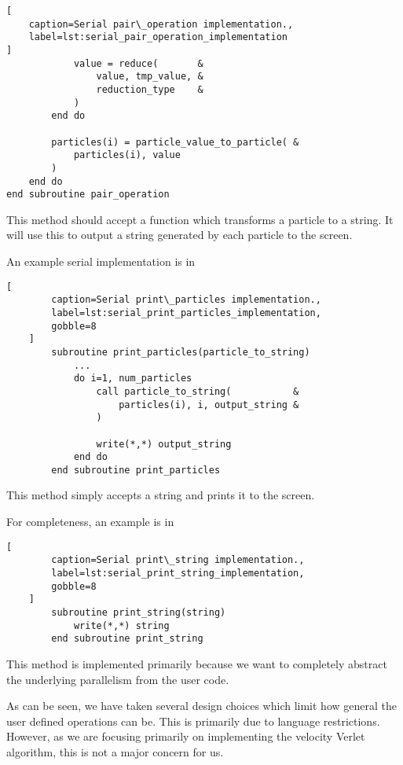 \begin{description}[style=nextline]
\begin{lstlisting}[
    caption=Serial pair\_operation implementation.,
    label=lst:serial_pair_operation_implementation
]
            value = reduce(       &
                value, tmp_value, &
                reduction_type    & 
            )
        end do

        particles(i) = particle_value_to_particle( &
            particles(i), value
        )
    end do
end subroutine pair_operation
\end{lstlisting}

\item[print\_particles]
    This method should accept a function which transforms a particle
    to a string. It will use this to output a string generated by
    each particle to the screen.

    An example serial implementation is in

    \begin{lstlisting}[
        caption=Serial print\_particles implementation.,
        label=lst:serial_print_particles_implementation,
        gobble=8
    ]
        subroutine print_particles(particle_to_string)
            ...
            do i=1, num_particles
                call particle_to_string(           &
                    particles(i), i, output_string &
                )

                write(*,*) output_string
            end do
        end subroutine print_particles
    \end{lstlisting}

\item[print\_string]
    This method simply accepts a string and prints it to the screen.

    For completeness, an example is in

    \begin{lstlisting}[
        caption=Serial print\_string implementation.,
        label=lst:serial_print_string_implementation,
        gobble=8
    ]
        subroutine print_string(string)
            write(*,*) string
        end subroutine print_string
    \end{lstlisting}

    This method is implemented primarily because we want to completely
    abstract the underlying parallelism from the user code.
\end  {description}

As can be seen, we have taken several design choices which limit how
general the user defined operations can be.
%
This is primarily due to language restrictions.
%
However, as we are focusing primarily on implementing the velocity
Verlet algorithm, this is not a major concern for us.

